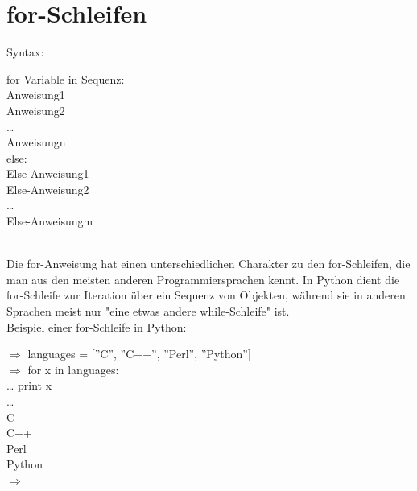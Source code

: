 \section{for-Schleifen}
Syntax:\\
\begin{MyConsoleBox}{
for Variable in Sequenz:		\\
\hspace{0.5cm}	Anweisung1		\\
\hspace{0.5cm}	Anweisung2		\\
\hspace{0.5cm}	\dots			\\
\hspace{0.5cm}	Anweisungn		\\
else:							\\
\hspace{0.5cm}	Else-Anweisung1 \\
\hspace{0.5cm}	Else-Anweisung2 \\
\hspace{0.5cm}	\dots			\\
\hspace{0.5cm}	Else-Anweisungm \\
}\end{MyConsoleBox}
\\
Die for-Anweisung hat einen unterschiedlichen Charakter zu den for-Schleifen, die man aus den meisten anderen Programmiersprachen kennt. In Python dient die for-Schleife zur Iteration über ein Sequenz von Objekten, während sie in anderen Sprachen meist nur "eine etwas andere while-Schleife" ist. \\
Beispiel einer for-Schleife in Python:  \\
\begin{MyConsoleBox}{
${\Longrightarrow}$ languages = [''C'', ''C++'', ''Perl'', ''Python''] \\
${\Longrightarrow}$ for x in languages: \\
\dots\hspace{0.5cm}     print x \\
\dots \\
C \\
C++ \\
Perl \\
Python \\
${\Longrightarrow}$  \\
}\end{MyConsoleBox}
\\
